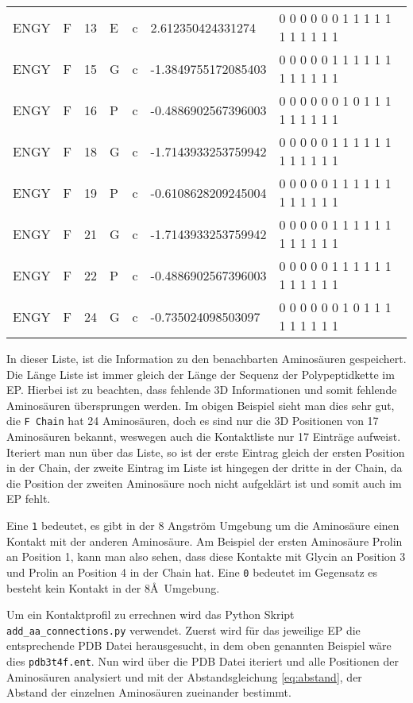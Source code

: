 \begin{table}
{\begin{tabular}{lllllll}
    ENGY & F & 13 & E & c & 2.612350424331274 & 0 0 0 0 0 0 1 1 1 1 1 1 1 1 1 1 1 \\
    ENGY & F & 15 & G & c & -1.3849755172085403 & 0 0 0 0 0 1 1 1 1 1 1 1 1 1 1 1 1 \\
    ENGY & F & 16 & P & c & -0.4886902567396003 & 0 0 0 0 0 0 1 0 1 1 1 1 1 1 1 1 1 \\
    ENGY & F & 18 & G & c & -1.7143933253759942 & 0 0 0 0 0 1 1 1 1 1 1 1 1 1 1 1 1 \\
    ENGY & F & 19 & P & c & -0.6108628209245004 & 0 0 0 0 0 1 1 1 1 1 1 1 1 1 1 1 1 \\
    ENGY & F & 21 & G & c & -1.7143933253759942 & 0 0 0 0 0 1 1 1 1 1 1 1 1 1 1 1 1 \\
    ENGY & F & 22 & P & c & -0.4886902567396003 & 0 0 0 0 0 1 1 1 1 1 1 1 1 1 1 1 1 \\
    ENGY & F & 24 & G & c & -0.735024098503097 & 0 0 0 0 0 0 1 0 1 1 1 1 1 1 1 1 1
    \end{tabular}}
\end{table}

In dieser Liste, ist die Information zu den benachbarten Aminosäuren gespeichert. Die Länge Liste ist immer gleich der Länge der Sequenz der Polypeptidkette im EP. Hierbei ist zu beachten, dass fehlende 3D Informationen und somit fehlende Aminosäuren übersprungen werden. Im obigen Beispiel sieht man dies sehr gut, die \texttt{F Chain} hat 24 Aminosäuren, doch es sind nur die 3D Positionen von 17 Aminosäuren bekannt, weswegen auch die Kontaktliste nur 17 Einträge aufweist. Iteriert man nun über das Liste, so ist der erste Eintrag gleich der ersten Position in der Chain, der zweite Eintrag im Liste ist hingegen der dritte in der Chain, da die Position der zweiten Aminosäure noch nicht aufgeklärt ist und somit auch im \ac{EP} fehlt.

Eine \texttt{1} bedeutet, es gibt in der 8 Angström Umgebung um die Aminosäure einen Kontakt mit der anderen Aminosäure. Am Beispiel der ersten Aminosäure Prolin an Position 1, kann man also sehen, dass diese Kontakte mit Glycin an Position 3 und Prolin an Position 4 in der Chain hat. Eine \texttt{0} bedeutet im Gegensatz es besteht kein Kontakt in der 8\AA\ Umgebung.

Um ein Kontaktprofil zu errechnen wird das Python Skript \texttt{add\-\_aa\-\_connections.py} verwendet. Zuerst wird für das jeweilige \ac{EP} die entsprechende \ac{PDB} Datei herausgesucht, in dem oben genannten Beispiel wäre dies \texttt{pdb3t4f.ent}. Nun wird über die \ac{PDB} Datei iteriert und alle Positionen der Aminosäuren analysiert und mit der Abstandsgleichung \ref{eq:abstand}, der Abstand der einzelnen Aminosäuren zueinander bestimmt.

